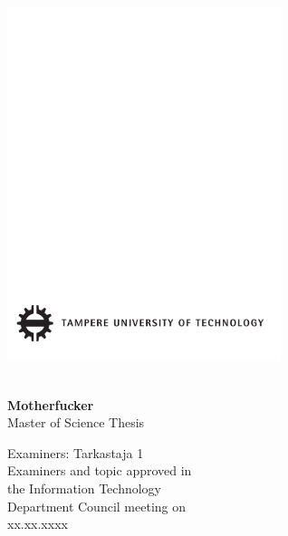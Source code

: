  
\thispagestyle{empty}
 
\vspace*{-.5cm}\noindent
 
 
\includegraphics[width=8cm]{tillbehor/tut-logo}
 
\vspace{6.8cm}
 
\\
{\bf\large \textsf{Motherfucker}}\\
\textsf{Master of Science Thesis}
 
\vspace{8.7cm} %
 
\begin{flushright}
  
\begin{minipage}[c]{6.8cm}
\begin{spacing}{1.0}
\textsf{Examiners: Tarkastaja 1}\\
\textsf{Examiners and topic approved in}\\ 
\textsf{the Information Technology}\\
\textsf{Department Council meeting on}\\
\textsf{xx.xx.xxxx}\\
\end{spacing}
\end{minipage}
\end{flushright}
 
